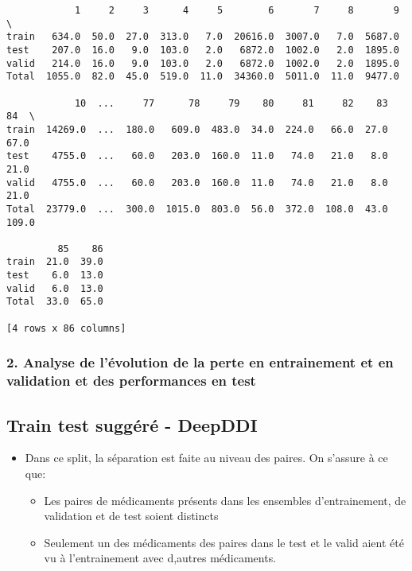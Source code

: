 \documentclass[11pt]{article}
\providecommand{\tightlist}{%
      \setlength{\itemsep}{0pt}\setlength{\parskip}{0pt}}
\begin{document}
    
    \begin{verbatim}
            1     2     3      4     5        6       7     8       9  \
train   634.0  50.0  27.0  313.0   7.0  20616.0  3007.0   7.0  5687.0   
test    207.0  16.0   9.0  103.0   2.0   6872.0  1002.0   2.0  1895.0   
valid   214.0  16.0   9.0  103.0   2.0   6872.0  1002.0   2.0  1895.0   
Total  1055.0  82.0  45.0  519.0  11.0  34360.0  5011.0  11.0  9477.0   

            10  ...     77      78     79    80     81     82    83     84  \
train  14269.0  ...  180.0   609.0  483.0  34.0  224.0   66.0  27.0   67.0   
test    4755.0  ...   60.0   203.0  160.0  11.0   74.0   21.0   8.0   21.0   
valid   4755.0  ...   60.0   203.0  160.0  11.0   74.0   21.0   8.0   21.0   
Total  23779.0  ...  300.0  1015.0  803.0  56.0  372.0  108.0  43.0  109.0   

         85    86  
train  21.0  39.0  
test    6.0  13.0  
valid   6.0  13.0  
Total  33.0  65.0  

[4 rows x 86 columns]
    \end{verbatim}

    
    \subsubsection{2. Analyse de l'évolution de la perte en entrainement et
en validation et des performances en
test}\label{analyse-de-luxe9volution-de-la-perte-en-entrainement-et-en-validation-et-des-performances-en-test}

    \subsection{Train test suggéré -
DeepDDI}\label{train-test-sugguxe9ruxe9---deepddi}

    \begin{itemize}
\tightlist
\item
  Dans ce split, la séparation est faite au niveau des paires. On
  s'assure à ce que:

  \begin{itemize}
  \tightlist
  \item
    Les paires de médicaments présents dans les ensembles
    d'entrainement, de validation et de test soient distincts
  \item
    Seulement un des médicaments des paires dans le test et le valid
    aient été vu à l'entrainement avec d,autres médicaments.
  \end{itemize}
\end{itemize}
\end{document}
